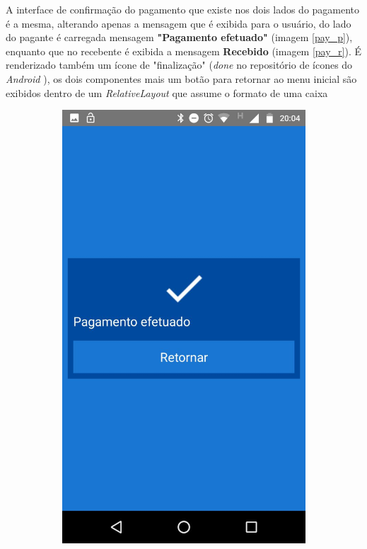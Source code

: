 \documentclass[hidelinks,12pt]{article}
\begin{document}
A interface de confirma\c{c}\~ao do pagamento que existe nos dois lados do pagamento \'e a mesma, alterando apenas a mensagem que \'e exibida para o usu\'ario, do lado do pagante \'e carregada mensagem \textbf{"Pagamento efetuado"} (imagem \ref{pay_p}), enquanto que no recebente \'e exibida a mensagem \textbf{Recebido} (imagem \ref{pay_r}). É renderizado tamb\'em um \'icone de "finaliza\c{c}\~ao" (\textit{done} no reposit\'orio de \'icones do \textit{Android} \cite{materialicon}), os dois componentes mais um bot\~ao para retornar ao menu inicial s\~ao exibidos dentro de um \textit{RelativeLayout} que assume o formato de uma caixa
\begin{figure}[H]
	\begin{subfigure}{0.5\textwidth}
		\includegraphics[scale=0.3]{pay_ok} 

\end{subfigure}
\end{figure}
\end{document}
